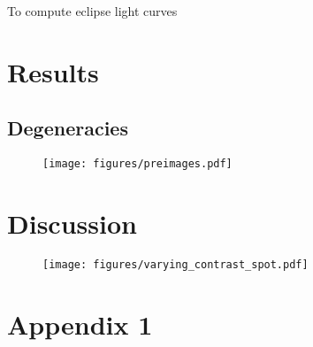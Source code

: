 \documentclass[modern]{aastex631}
\begin{document}
To compute eclipse light curves 
\section{Results}
\label{sec:results}

\subsection{Degeneracies}
\label{ssec:degeneracies}


\begin{figure}[t!]
    \begin{centering}
    \texttt{[image: figures/preimages.pdf]}
    \caption{}
    \label{fig:preimages}
    \end{centering}
\end{figure}





\section{Discussion}
\label{sec:discussion}

\begin{figure}[t!]
    \begin{centering}
    \texttt{[image: figures/varying\_contrast\_spot.pdf]}
    \caption{}
    \label{fig:varying_contrast_spot}
    \end{centering}
\end{figure}






\appendix
\section{Appendix 1}
\clearpage
\end{document}
